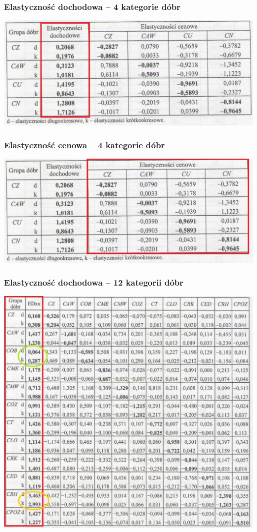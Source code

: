 \documentclass[11pt,usenames,dvipsnames,svgnames,x11names]{beamer}\usepackage[]{graphicx}\usepackage[]{color}
\theoremstyle{definition}
\theoremstyle{remark}
\begin{document}

\begin{frame}
\frametitle{Elastyczność dochodowa -- 4 kategorie dóbr}
\includegraphics[scale=1]{1.jpg}
\end{frame}

\begin{frame}
\frametitle{Elastyczność cenowa -- 4 kategorie dóbr}
\includegraphics[scale=1]{2.jpg}
\end{frame}

\begin{frame}
\begin{center}
\frametitle{Elastyczność dochodowa -- 12 kategorii dóbr}
\includegraphics[scale=0.65]{4.jpg}
\end{center}
\end{frame}
\end{document}
